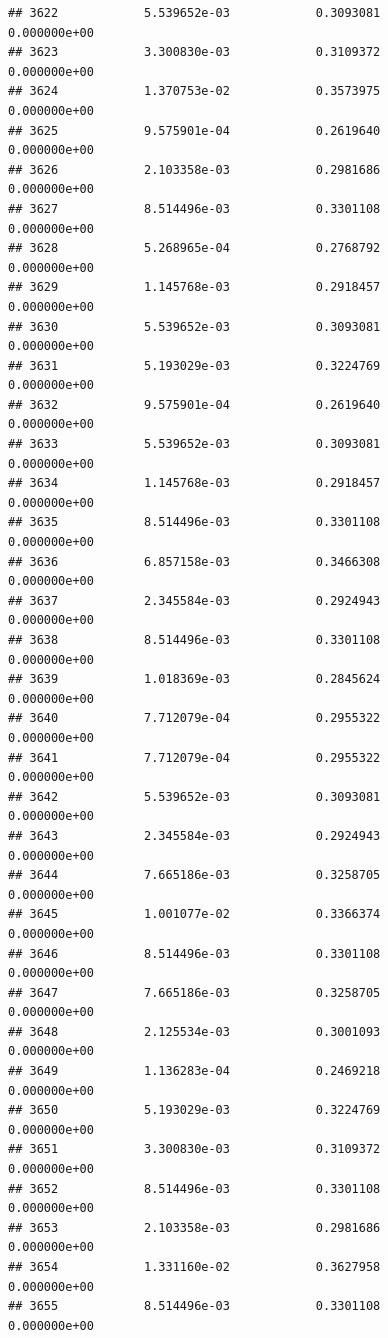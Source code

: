 \documentclass[
]{article}
\begin{document}
\begin{verbatim}
## 3622            5.539652e-03            0.3093081            0.000000e+00
## 3623            3.300830e-03            0.3109372            0.000000e+00
## 3624            1.370753e-02            0.3573975            0.000000e+00
## 3625            9.575901e-04            0.2619640            0.000000e+00
## 3626            2.103358e-03            0.2981686            0.000000e+00
## 3627            8.514496e-03            0.3301108            0.000000e+00
## 3628            5.268965e-04            0.2768792            0.000000e+00
## 3629            1.145768e-03            0.2918457            0.000000e+00
## 3630            5.539652e-03            0.3093081            0.000000e+00
## 3631            5.193029e-03            0.3224769            0.000000e+00
## 3632            9.575901e-04            0.2619640            0.000000e+00
## 3633            5.539652e-03            0.3093081            0.000000e+00
## 3634            1.145768e-03            0.2918457            0.000000e+00
## 3635            8.514496e-03            0.3301108            0.000000e+00
## 3636            6.857158e-03            0.3466308            0.000000e+00
## 3637            2.345584e-03            0.2924943            0.000000e+00
## 3638            8.514496e-03            0.3301108            0.000000e+00
## 3639            1.018369e-03            0.2845624            0.000000e+00
## 3640            7.712079e-04            0.2955322            0.000000e+00
## 3641            7.712079e-04            0.2955322            0.000000e+00
## 3642            5.539652e-03            0.3093081            0.000000e+00
## 3643            2.345584e-03            0.2924943            0.000000e+00
## 3644            7.665186e-03            0.3258705            0.000000e+00
## 3645            1.001077e-02            0.3366374            0.000000e+00
## 3646            8.514496e-03            0.3301108            0.000000e+00
## 3647            7.665186e-03            0.3258705            0.000000e+00
## 3648            2.125534e-03            0.3001093            0.000000e+00
## 3649            1.136283e-04            0.2469218            0.000000e+00
## 3650            5.193029e-03            0.3224769            0.000000e+00
## 3651            3.300830e-03            0.3109372            0.000000e+00
## 3652            8.514496e-03            0.3301108            0.000000e+00
## 3653            2.103358e-03            0.2981686            0.000000e+00
## 3654            1.331160e-02            0.3627958            0.000000e+00
## 3655            8.514496e-03            0.3301108            0.000000e+00

\end{verbatim}
\end{document}
